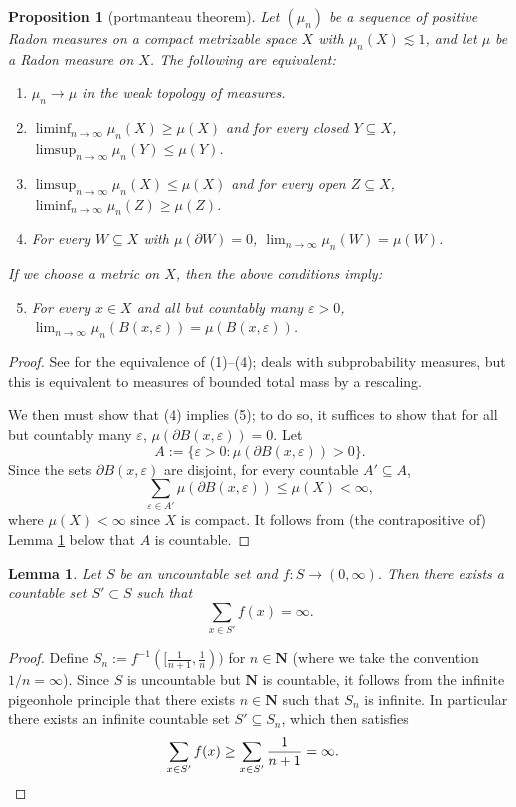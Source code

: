 \documentclass[reqno,11pt]{amsart}
\newcommand{\NN}{\mathbf{N}}
\newtheorem{lemma}[theorem]{Lemma}
\newtheorem{proposition}[theorem]{Proposition}
\theoremstyle{definition}
\numberwithin{equation}{section}
\begin{document}
\begin{proposition}[portmanteau theorem]
	Let $(\mu_n)$ be a sequence of positive Radon measures on a compact metrizable space $X$ with $\mu_n(X) \lesssim 1$, and let $\mu$ be a Radon measure on $X$. The following are equivalent:
\begin{enumerate}
	\item $\mu_n \to \mu$ in the weak topology of measures.
	\item $\liminf_{n \to \infty} \mu_n(X) \geq \mu(X)$ and for every closed $Y \subseteq X$, $\limsup_{n \to \infty} \mu_n(Y) \leq \mu(Y)$.
	\item $\limsup_{n \to \infty} \mu_n(X) \leq \mu(X)$ and for every open $Z \subseteq X$, $\liminf_{n \to \infty} \mu_n(Z) \geq \mu(Z)$.
	\item For every $W \subseteq X$ with $\mu(\partial W) = 0$, $\lim_{n \to \infty} \mu_n(W) = \mu(W)$.
\end{enumerate}
	If we choose a metric on $X$, then the above conditions imply:
\begin{enumerate}
	\setcounter{enumi}{4}
	\item For every $x \in X$ and all but countably many $\varepsilon > 0$, $\lim_{n \to \infty} \mu_n(B(x, \varepsilon)) = \mu(B(x, \varepsilon))$.
\end{enumerate}
\end{proposition}
\begin{proof}
	See \cite[Theorem 13.16]{klenke2013probability} for the equivalence of (1)--(4); \cite{klenke2013probability} deals with subprobability measures, but this is equivalent to measures of bounded total mass by a rescaling.

	We then must show that (4) implies (5); to do so, it suffices to show that for all but countably many $\varepsilon$, $\mu(\partial B(x, \varepsilon)) = 0$.
	Let
	$$A := \{\varepsilon > 0: \mu(\partial B(x, \varepsilon)) > 0\}.$$
	Since the sets $\partial B(x, \varepsilon)$ are disjoint, for every countable $A' \subseteq A$,
	$$\sum_{\varepsilon \in A'} \mu(\partial B(x, \varepsilon)) \leq \mu(X) < \infty,$$
	where $\mu(X) < \infty$ since $X$ is compact.
	It follows from (the contrapositive of) Lemma \ref{cardinality appendix} below that $A$ is countable.
\end{proof}

\begin{lemma}\label{cardinality appendix}
Let $S$ be an uncountable set and $f: S \to (0, \infty)$. Then there exists a countable set $S' \subset S$ such that
$$\sum_{x \in S'} f(x) = \infty.$$
\end{lemma}
\begin{proof}
Define $S_n := f^{-1}([\frac{1}{n + 1}, \frac{1}{n}))$ for $n \in \NN$ (where we take the convention $1/n = \infty$).
Since $S$ is uncountable but $\NN$ is countable, it follows from the infinite pigeonhole principle that there exists $n \in \NN$ such that $S_n$ is infinite.
In particular there exists an infinite countable set $S' \subseteq S_n$, which then satisfies
\begin{align*}
\sum_{x \in S'} f(x) &\geq \sum_{x \in S'} \frac{1}{n + 1} = \infty. \qedhere 
\end{align*}
\end{proof}
\end{document}
